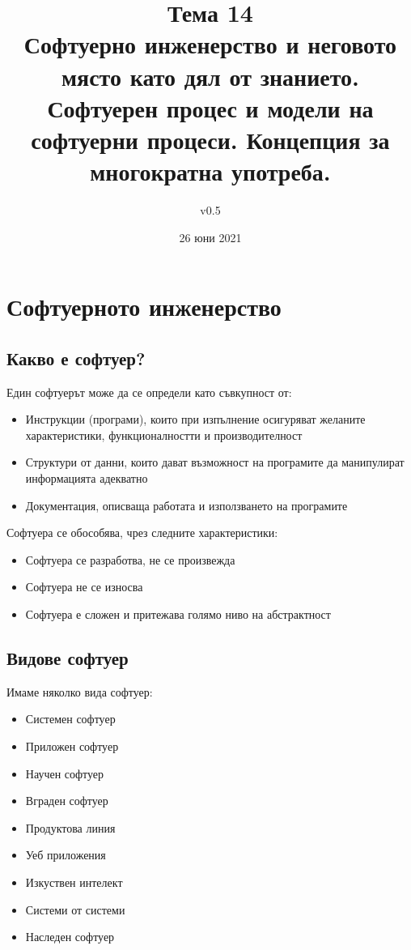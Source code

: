 \documentclass[fleqn,12pt]{article}
\title{Тема 14\\ Софтуерно инженерство и неговото място като дял от знанието. Софтуерен процес и модели на софтуерни процеси. Концепция за многократна употреба.}
\author{v0.5}
\date{26 юни 2021}
\begin{document}
\maketitle

\tableofcontents

\clearpage

\section{Софтуерното  инженерство}
\subsection{Какво  е  софтуер?}
Един софтуерът може да се определи като съвкупност от:
\begin{itemize}
	\item Инструкции (програми), които при изпълнение осигуряват желаните характеристики, функционалностти и производителност
	\item Структури от данни, които дават възможност на програмите да манипулират информацията адекватно
	\item Документация, описваща работата и използването на програмите
\end{itemize}

Софтуера се обособява, чрез следните характеристики:
\begin{itemize}
	\item Софтуера се разработва, не се произвежда
	\item Софтуера не се износва
	\item Софтуера е сложен и притежава голямо ниво на абстрактност
\end{itemize}

\subsection{Видове  софтуер}
Имаме няколко вида софтуер:
\begin{itemize}
	\item Системен софтуер
	\item Приложен софтуер
	\item Научен софтуер
	\item Вграден софтуер
	\item Продуктова линия
	\item Уеб приложения
	\item Изкуствен интелект
	\item Системи от системи
	\item Наследен софтуер
\end{itemize}
\end{document}
